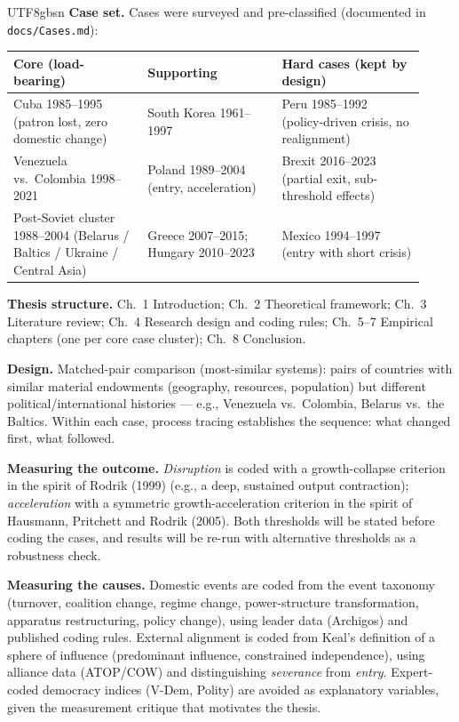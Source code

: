 \documentclass[10pt]{article}
\begin{document}
\begin{CJK}{UTF8}{gbsn}
\noindent\textbf{Case set.} Cases were surveyed and pre-classified (documented in \texttt{docs/Cases.md}):

\begin{center}\small
\begin{tabular}{p{0.30\linewidth} p{0.30\linewidth} p{0.32\linewidth}}
\toprule
\textbf{Core (load-bearing)} & \textbf{Supporting} & \textbf{Hard cases (kept by design)} \\
\midrule
Cuba 1985--1995 (patron lost, zero domestic change) & South Korea 1961--1997 & Peru 1985--1992 (policy-driven crisis, no realignment) \\
Venezuela vs.\ Colombia 1998--2021 & Poland 1989--2004 (entry, acceleration) & Brexit 2016--2023 (partial exit, sub-threshold effects) \\
Post-Soviet cluster 1988--2004 (Belarus / Baltics / Ukraine / Central Asia) & Greece 2007--2015; Hungary 2010--2023 & Mexico 1994--1997 (entry with short crisis) \\
\bottomrule
\end{tabular}
\end{center}

\noindent\textbf{Thesis structure.} Ch.~1 Introduction; Ch.~2 Theoretical framework; Ch.~3 Literature review; Ch.~4 Research design and coding rules; Ch.~5--7 Empirical chapters (one per core case cluster); Ch.~8 Conclusion.

\newpage


\vspace{6pt}
\noindent\textbf{Design.} Matched-pair comparison (most-similar systems): pairs of countries with similar material endowments (geography, resources, population) but different political/international histories --- e.g., Venezuela vs.\ Colombia, Belarus vs.\ the Baltics. Within each case, process tracing establishes the sequence: what changed first, what followed.

\noindent\textbf{Measuring the outcome.} \emph{Disruption} is coded with a growth-collapse criterion in the spirit of Rodrik (1999) (e.g., a deep, sustained output contraction); \emph{acceleration} with a symmetric growth-acceleration criterion in the spirit of Hausmann, Pritchett and Rodrik (2005). Both thresholds will be stated before coding the cases, and results will be re-run with alternative thresholds as a robustness check.

\noindent\textbf{Measuring the causes.} Domestic events are coded from the event taxonomy (turnover, coalition change, regime change, power-structure transformation, apparatus restructuring, policy change), using leader data (Archigos) and published coding rules. External alignment is coded from Keal's definition of a sphere of influence (predominant influence, constrained independence), using alliance data (ATOP/COW) and distinguishing \emph{severance} from \emph{entry}. Expert-coded democracy indices (V-Dem, Polity) are avoided as explanatory variables, given the measurement critique that motivates the thesis.


\end{CJK}
\end{document}
